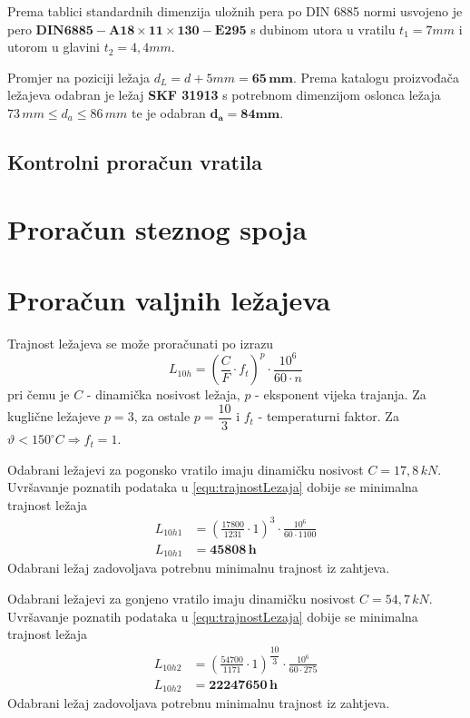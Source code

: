 \documentclass[11pt,a4paper,openright,twoside]{report}
\begin{document}
Prema tablici standardnih dimenzija uložnih pera\cite{potrebniMaterijali} po DIN 6885 normi usvojeno je pero $\mathbf{DIN6885-A 18 \times 11 \times 130-E295}$ s dubinom utora u vratilu $t_1=7mm$ i utorom u glavini $t_2=4,4mm$.

Promjer na poziciji ležaja $d_L=d+5mm= \mathbf{65 \,mm}$.
Prema katalogu proizvođača ležajeva\cite{skf} odabran je ležaj \textbf{SKF 31913} s potrebnom dimenzijom oslonca ležaja $73 \, mm \leq d_a \leq 86 \, mm$ te je odabran $\mathbf{d_a=84mm}$.

\subsection{Kontrolni proračun vratila}

\section{Proračun steznog spoja}

\section{Proračun valjnih ležajeva}
Trajnost ležajeva se može proračunati po izrazu
\begin{equation}
L_{10h}=\left(\frac{C}{F} \cdot f_t \right)^p \cdot \frac{10^6}{60 \cdot n}
\label{equ:trajnostLezaja}
\end{equation}
pri čemu je $C$ - dinamička nosivost ležaja, $p$ - eksponent vijeka trajanja. Za kuglične ležajeve $p=3$, za ostale $p=\dfrac{10}{3}$ i $f_t$ - temperaturni faktor. Za $\vartheta < 150^\circ C \Rightarrow f_t=1$.

Odabrani ležajevi za pogonsko vratilo imaju dinamičku nosivost $C=17,8 \,kN$.
Uvršavanje poznatih podataka u \eqref{equ:trajnostLezaja} dobije se minimalna trajnost ležaja
\begin{align*}
L_{10h1}&=\left(\frac{17800}{1231} \cdot 1 \right)^3 \cdot \frac{10^6}{60 \cdot 1100}\\
L_{10h1}&=\mathbf{45808\, h}
\end{align*}
Odabrani ležaj zadovoljava potrebnu minimalnu trajnost iz zahtjeva.

Odabrani ležajevi za gonjeno vratilo imaju dinamičku nosivost $C=54,7 \,kN$.
Uvršavanje poznatih podataka u \eqref{equ:trajnostLezaja} dobije se minimalna trajnost ležaja
\begin{align*}
L_{10h2}&=\left(\frac{54700}{1171} \cdot 1 \right)^{\dfrac{10}{3}} \cdot \frac{10^6}{60 \cdot 275}\\
L_{10h2}&=\mathbf{22247650\, h}
\end{align*}
Odabrani ležaj zadovoljava potrebnu minimalnu trajnost iz zahtjeva.


\newpage
\nocite{*}


\newpage
\appendix
{}


\end{document}
